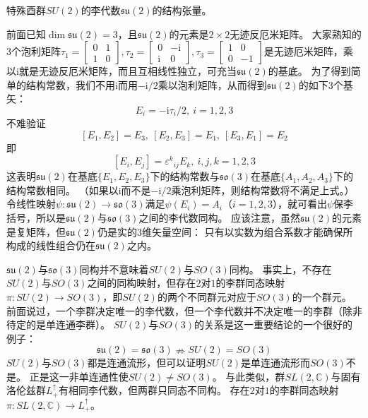 \begin{example}
    特殊酉群$SU(2)$的李代数$\mathfrak{su}(2)$的结构张量。

    前面已知$\dim\mathfrak{su}(2) = 3$，且$\mathfrak{su}(2)$的元素是$2 \times 2$无迹反厄米矩阵。
    大家熟知的$3$个泡利矩阵$\tau_1 = \begin{bmatrix}
        0 & 1 \\
        1 & 0
    \end{bmatrix}, \tau_2 = \begin{bmatrix}
        0 & -\mathrm{i} \\
        \mathrm{i} & 0
    \end{bmatrix}, \tau_3 = \begin{bmatrix}
        1 & 0 \\
        0 & -1
    \end{bmatrix}$是无迹厄米矩阵，乘以$\mathrm{i}$就是无迹反厄米矩阵，而且互相线性独立，可充当$\mathfrak{su}(2)$的基底。
    为了得到简单的结构常数，我们不用$\mathrm{i}$而用$-\mathrm{i} / 2$乘以泡利矩阵，从而得到$\mathfrak{su}(2)$的如下$3$个基矢：
    $$E_i = -\mathrm{i}\tau_i / 2, ~ i = 1, 2, 3$$
    不难验证
    $$[E_1, E_2] = E_3, ~ [E_2, E_3] = E_1, ~ [E_3, E_1] = E_2$$
    即
    $$[E_i, E_j] = \varepsilon^k{}_{ij}E_k, ~ i, j, k = 1, 2, 3$$
    这表明$\mathfrak{su}(2)$在基底$\{E_1, E_2, E_3\}$下的结构常数与$\mathfrak{so}(3)$在基底$\{A_1, A_2, A_3\}$下的结构常数相同。
    （如果以$\mathrm{i}$而不是$-\mathrm{i} / 2$乘泡利矩阵，则结构常数将不满足上式。）
    令线性映射$\psi \colon \mathfrak{su}(2) \to \mathfrak{so}(3)$满足$\psi(E_i) = A_i$（$i = 1, 2, 3$），就可看出$\psi$保李括号，所以是$\mathfrak{su}(2)$与$\mathfrak{so}(3)$之间的李代数同构。
    应该注意，虽然$\mathfrak{su}(2)$的元素是复矩阵，但$\mathfrak{su}(2)$仍是实的$3$维矢量空间：
    只有以实数为组合系数才能确保所构成的线性组合仍在$\mathfrak{su}(2)$之内。

    $\mathfrak{su}(2)$与$\mathfrak{so}(3)$同构并不意味着$SU(2)$与$SO(3)$同构。
    事实上，不存在$SU(2)$与$SO(3)$之间的同构映射，但存在$2$对$1$的李群同态映射$\pi \colon SU(2) \to SO(3)$，即$SU(2)$的两个不同群元对应于$SO(3)$的一个群元。
    前面说过，一个李群决定唯一的李代数，但一个李代数并不决定唯一的李群（除非待定的是单连通李群）。
    $SU(2)$与$SO(3)$的关系是这一重要结论的一个很好的例子：
    $$\mathfrak{su}(2) = \mathfrak{so}(3) \nRightarrow SU(2) = SO(3)$$
    $SU(2)$与$SO(3)$都是连通流形，但可以证明$SU(2)$是单连通流形而$SO(3)$不是。
    正是这一非单连通性使$SU(2) \neq SO(3)$。
    与此类似，群$SL(2, \mathbb{C})$与固有洛伦兹群$L^\uparrow_+$有相同李代数，但两群只同态不同构。
    存在$2$对$1$的李群同态映射$\pi \colon SL(2, \mathbb{C}) \to L^\uparrow_+$。
\end{example}

